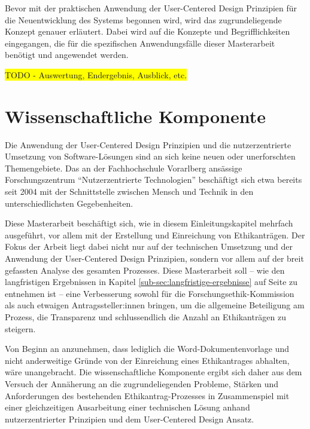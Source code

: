 \documentclass[a4paper,12pt,twoside]{scrreprt}
\begin{document}
Bevor mit der praktischen Anwendung der User-Centered Design Prinzipien für die Neuentwicklung des Systems begonnen wird, wird das zugrundeliegende Konzept genauer erläutert. Dabei wird auf die Konzepte und Begrifflichkeiten eingegangen, die für die spezifischen Anwendungsfälle dieser Masterarbeit benötigt und angewendet werden.

\colorbox{yellow}{TODO - Auswertung, Endergebnis, Ausblick, etc.}

\section{Wissenschaftliche Komponente}
\label{sec:wissenschaftliche-komponente}

Die Anwendung der User-Centered Design Prinzipien und die nutzerzentrierte Umsetzung von Software-Lösungen sind an sich keine neuen oder unerforschten Themengebiete. Das an der Fachhochschule Vorarlberg ansässige Forschungszentrum \enquote{Nutzerzentrierte Technologien} beschäftigt sich etwa bereits seit 2004 mit der Schnittstelle zwischen Mensch und Technik in den unterschiedlichsten Gegebenheiten. \cite{fachhochschule_vorarlberg_gmbh_nutzerzentrierte_2021}

Diese Masterarbeit beschäftigt sich, wie in diesem Einleitungskapitel mehrfach ausgeführt, vor allem mit der Erstellung und Einreichung von Ethikanträgen. Der Fokus der Arbeit liegt dabei nicht nur auf der technischen Umsetzung und der Anwendung der User-Centered Design Prinzipien, sondern vor allem auf der breit gefassten Analyse des gesamten Prozesses. Diese Masterarbeit soll -- wie den langfristigen Ergebnissen in Kapitel \ref{sub-sec:langfristige-ergebnisse} auf Seite \pageref{sub-sec:langfristige-ergebnisse} zu entnehmen ist -- eine Verbesserung sowohl für die Forschungsethik-Kommission als auch etwaigen Antragssteller:innen bringen, um die allgemeine Beteiligung am Prozess, die Transparenz und schlussendlich die Anzahl an Ethikanträgen zu steigern.

Von Beginn an anzunehmen, dass lediglich die Word-Dokumentenvorlage und nicht anderweitige Gründe von der Einreichung eines Ethikantrages abhalten, wäre unangebracht. Die wissenschaftliche Komponente ergibt sich daher aus dem Versuch der Annäherung an die zugrundeliegenden Probleme, Stärken und Anforderungen des bestehenden Ethikantrag-Prozesses in Zusammenspiel mit einer gleichzeitigen Ausarbeitung einer technischen Lösung anhand nutzerzentrierter Prinzipien und dem User-Centered Design Ansatz.
\end{document}
